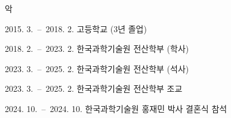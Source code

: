 \documentclass[master,english,draft]{kaist-ucs} %
\begin{document}






\acknowledgment[4]
악

\curriculumvitae[4]

  \begin{personaldata}
  \end{personaldata}

  \begin{education}
    \item[2015. 3.\ --\ 2018. 2.] 고등학교 (3년 졸업)
    \item[2018. 2.\ --\ 2023. 2.] 한국과학기술원 전산학부 (학사)
    \item[2023. 3.\ --\ 2025. 2.] 한국과학기술원 전산학부 (석사)
  \end{education}

  \begin{career}
    \item[2023. 3.\ --\ 2025. 2.] 한국과학기술원 전산학부 조교
    \item[2024. 10.\ --\ 2024. 10.] 한국과학기술원 홍재민 박사 결혼식 참석
  \end{career}

\end{document}
